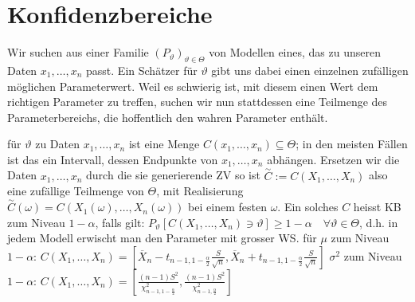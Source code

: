 
\section{Konfidenzbereiche}
Wir suchen aus einer Familie $(P_\vartheta)_{\vartheta \in \Theta}$ von Modellen eines, das zu unseren Daten $x_1, \dots, x_n$ passt. Ein Schätzer für $\vartheta$ gibt uns dabei einen einzelnen zufälligen möglichen Parameterwert. Weil es schwierig ist, mit diesem einen Wert dem richtigen Parameter zu treffen, suchen wir nun stattdessen eine Teilmenge des Parameterbereichs, die hoffentlich den wahren Parameter enthält.
\begin{itemize}
     für $\vartheta$ zu Daten $x_1, \dots, x_n$ ist eine Menge $C(x_1, \dots, x_n) \subseteq \Theta$; in den meisten Fällen ist das ein Intervall, dessen Endpunkte von $x_1, \dots, x_n$ abhängen. Ersetzen wir die Daten $x_1, \dots, x_n$ durch die sie generierende ZV so ist $\overset{\sim}{C} := C(X_1, \dots, X_n)$ also eine zufällige Teilmenge von $\Theta$, mit Realisierung $\overset{\sim}{C}(\omega) = C(X_1(\omega), \dots, X_n(\omega))$ bei einem festen $\omega$. Ein solches $C$ heisst KB zum Niveau $1 - \alpha$, falls gilt: $P_\vartheta[C(X_1, \dots, X_n) \ni \vartheta] \ge 1 - \alpha \quad \forall \vartheta \in \Theta$, d.h. in jedem Modell erwischt man den Parameter mit grosser WS.
     für $\mu$ zum Niveau $1 - \alpha$: $C(X_1, \dots, X_n) = \left[ \overline X_n - t_{n - 1, 1 - \frac{\alpha}{2}} \frac{S}{\sqrt{n}}, \overline X_n + t_{n - 1, 1 - \frac{\alpha}{2}} \frac{S}{\sqrt{n}} \right]$
     $\sigma^2$ zum Niveau $1 - \alpha$: $C(X_1, \dots, X_n) = \left[\frac{(n - 1)S^2}{\chi_{n - 1, 1 - \frac{\alpha}{2}}^2}, \frac{(n - 1)S^2}{\chi_{n - 1, \frac{\alpha}{2}}^2} \right]$
\end{itemize}

